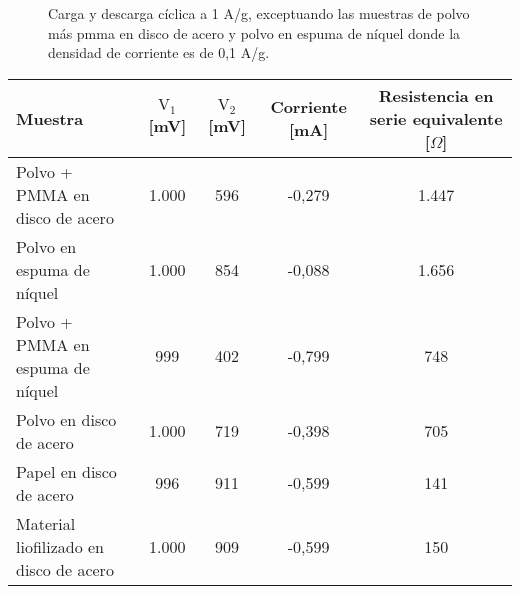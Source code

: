 \begin{figure}[h!]
\begin{subfigure}{0.4\textwidth}
	\end{subfigure}
	\caption{Carga y descarga cíclica a 1 A/g, exceptuando las muestras de polvo más pmma en disco de acero y polvo en espuma de níquel donde la densidad de corriente es de 0,1 A/g.}
	\label{fig:resumen_ccd}
\end{figure}


\begin{table}[h!]
	\centering
	\begin{tabular}{l c c c c}
			Muestra	&	$\mathrm{V_1}$ [mV]	&	$\mathrm{V_2}$ [mV]	&	Corriente [mA]	&	Resistencia en serie equivalente [$\Omega$]	\\
		\hline
		Polvo + PMMA en disco de acero			&	1.000	&	596	&	-0,279	&	1.447	\\
		Polvo en espuma de níquel				&	1.000	&	854	&	-0,088	&	1.656	\\
		Polvo + PMMA en espuma de níquel		&	999		&	402	&	-0,799	&	748		\\
		Polvo en disco de acero					&	1.000	&	719	&	-0,398	&	705		\\
		Papel en disco de acero					&	996		&	911	&	-0,599	&	141		\\
		Material liofilizado en disco de acero	&	1.000	&	909	&	-0,599	&	150		\\
	\end{tabular}
\end{table}

